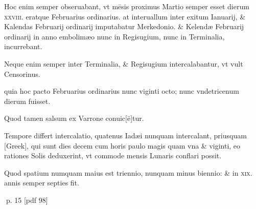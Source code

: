 \begin{parnumbers}
Hoc enim semper obseruabant, vt mēsis proximus Martio semper esset dierum \textsc{xxviii}. eratque Februarius ordinarius. at interuallum inter exitum Ianuarij, \& Kalendas Februarij ordinarij imputabatur Merkedonio. \& Kelendæ Februarij ordinarij in anno embolimæo nunc in Regisugium, nunc in Terminalia, incurrebant.

Neque enim semper inter Terminalia, \& Regisugium intercalabantur, vt vult Censorinus.

quia hoc pacto Februarius ordinarius nunc viginti octo; nunc vndetricenum dierum fuisset.

Quod tamen salsum ex Varrone conuic[ē]tur.

Tempore differt intercalatio, quatenus Iadæi nunquam intercalant, priusquam \textgreek{[Greek]}, qui sunt dies decem cum horis paulo magis quam vna \& viginti, eo rationes Solis deduxerint, vt commode mensis Lunaris conflari possit.

Quod spatium numquam maius est triennio, nunquam minus biennio: \& in \textsc{xix}. annis semper septies fit.

\end{parnumbers}
\clearpage
p. 15 [pdf 98]

